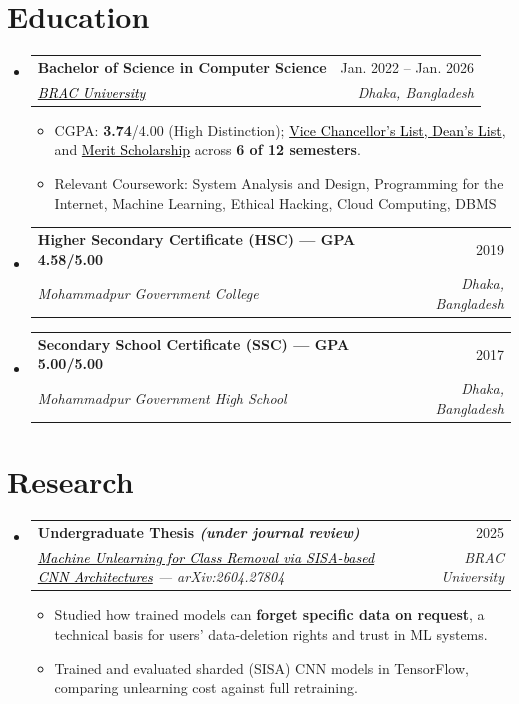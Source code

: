 \documentclass[a4paper]{article}
\makeatletter
\newcommand{\resumeItem}[1]{
  \item\small{
    {#1 \vspace{-2pt}}
  }
}
\newcommand{\resumeSubheading}[4]{
  \vspace{-2pt}\item
    \begin{tabular*}{0.97\textwidth}[t]{l@{\extracolsep{\fill}}r}
      \textbf{#1} & #2 \\
      \textit{\small#3} & \textit{\small #4} \\
    \end{tabular*}\vspace{-7pt}
}
\newcommand{\resumeSubHeadingListStart}{\begin{itemize}[leftmargin=0.15in, label={}]}
\newcommand{\resumeSubHeadingListEnd}{\end{itemize}}
\newcommand{\resumeItemListStart}{\begin{itemize}}
\newcommand{\resumeItemListEnd}{\end{itemize}\vspace{-5pt}}
\makeatother
\begin{document}
\section{Education}
  \resumeSubHeadingListStart
    \resumeSubheading
      {Bachelor of Science in Computer Science}{Jan. 2022 -- Jan. 2026}
      {\href{https://www.bracu.ac.bd/}{\textcolor{black}{BRAC University}}}{Dhaka, Bangladesh}
      \resumeItemListStart
        \resumeItem{CGPA: \textbf{3.74}/4.00 (High Distinction); \href{https://www.bracu.ac.bd/academics/policies-and-procedures/academic-standings-and-honors}{\textcolor{black}{Vice Chancellor's List, Dean's List}}, and \href{https://www.bracu.ac.bd/admissions/international-applicants/scholarship-financial-aid}{\textcolor{black}{Merit Scholarship}} across \textbf{6 of 12 semesters}.}
        \resumeItem{Relevant Coursework: System Analysis and Design, Programming for the Internet, Machine Learning, Ethical Hacking, Cloud Computing, DBMS}
      \resumeItemListEnd
    \resumeSubheading
      {Higher Secondary Certificate (HSC) --- GPA 4.58/5.00}{2019}
      {Mohammadpur Government College}{Dhaka, Bangladesh}
    \resumeSubheading
      {Secondary School Certificate (SSC) --- GPA 5.00/5.00}{2017}
      {Mohammadpur Government High School}{Dhaka, Bangladesh}
  \resumeSubHeadingListEnd
\vspace{6pt}


\section{Research}
  \resumeSubHeadingListStart
    \resumeSubheading
      {Undergraduate Thesis \textit{\small (under journal review)}}{2025}
      {\href{https://arxiv.org/abs/2604.27804}{\textcolor{black}{Machine Unlearning for Class Removal via SISA-based CNN Architectures}} --- arXiv:2604.27804}{BRAC University}
      \resumeItemListStart
        \resumeItem{Studied how trained models can \textbf{forget specific data on request}, a technical basis for users' data-deletion rights and trust in ML systems.}
        \resumeItem{Trained and evaluated sharded (SISA) CNN models in TensorFlow, comparing unlearning cost against full retraining.}
      \resumeItemListEnd
  \resumeSubHeadingListEnd


\end{document}

